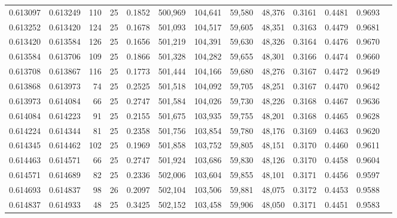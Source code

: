 \begin{tabular}{rrrrrrrrrrrrr}
0.613097 & 0.613249 &   110 &  25 &                                     0.1852 & 500,969 & 104,641 &  59,580 &  48,376 & 0.3161 & 0.4481 & 0.9693 \\
0.613252 & 0.613420 &   124 &  25 &                                     0.1678 & 501,093 & 104,517 &  59,605 &  48,351 & 0.3163 & 0.4479 & 0.9681 \\
0.613420 & 0.613584 &   126 &  25 &                                     0.1656 & 501,219 & 104,391 &  59,630 &  48,326 & 0.3164 & 0.4476 & 0.9670 \\
0.613584 & 0.613706 &   109 &  25 &                                     0.1866 & 501,328 & 104,282 &  59,655 &  48,301 & 0.3166 & 0.4474 & 0.9660 \\
0.613708 & 0.613867 &   116 &  25 &                                     0.1773 & 501,444 & 104,166 &  59,680 &  48,276 & 0.3167 & 0.4472 & 0.9649 \\
0.613868 & 0.613973 &    74 &  25 &                                     0.2525 & 501,518 & 104,092 &  59,705 &  48,251 & 0.3167 & 0.4470 & 0.9642 \\
0.613973 & 0.614084 &    66 &  25 &                                     0.2747 & 501,584 & 104,026 &  59,730 &  48,226 & 0.3168 & 0.4467 & 0.9636 \\
0.614084 & 0.614223 &    91 &  25 &                                     0.2155 & 501,675 & 103,935 &  59,755 &  48,201 & 0.3168 & 0.4465 & 0.9628 \\
0.614224 & 0.614344 &    81 &  25 &                                     0.2358 & 501,756 & 103,854 &  59,780 &  48,176 & 0.3169 & 0.4463 & 0.9620 \\
0.614345 & 0.614462 &   102 &  25 &                                     0.1969 & 501,858 & 103,752 &  59,805 &  48,151 & 0.3170 & 0.4460 & 0.9611 \\
0.614463 & 0.614571 &    66 &  25 &                                     0.2747 & 501,924 & 103,686 &  59,830 &  48,126 & 0.3170 & 0.4458 & 0.9604 \\
0.614571 & 0.614689 &    82 &  25 &                                     0.2336 & 502,006 & 103,604 &  59,855 &  48,101 & 0.3171 & 0.4456 & 0.9597 \\
0.614693 & 0.614837 &    98 &  26 &                                     0.2097 & 502,104 & 103,506 &  59,881 &  48,075 & 0.3172 & 0.4453 & 0.9588 \\
0.614837 & 0.614933 &    48 &  25 &                                     0.3425 & 502,152 & 103,458 &  59,906 &  48,050 & 0.3171 & 0.4451 & 0.9583 \\

\end{tabular}
